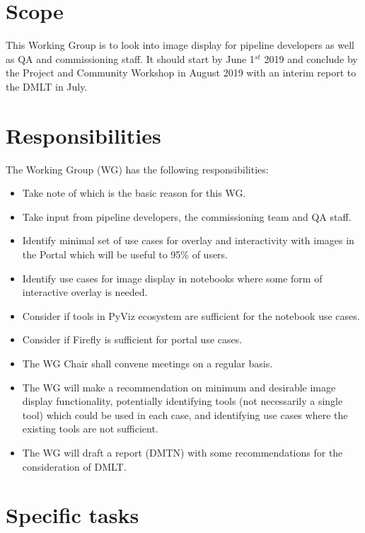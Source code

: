\section{Scope}

This Working Group is to look into image display for pipeline developers as well as \gls{QA} and commissioning staff.
It should start by June  1$^{st}$ 2019 and conclude by the Project and Community Workshop in August 2019 with an interim report to the  \gls{DMLT} in July.


\section{Responsibilities}

The Working Group (\gls{WG}) has the following responsibilities:

\begin{itemize}
 \item Take note of  which is the basic reason for this \gls{WG}.
 \item Take input from pipeline developers, the commissioning team and \gls{QA} staff.
 \item Identify minimal set of use cases for overlay and interactivity with images in the Portal which will be useful to 95\% of users.
 \item Identify use cases for image display in notebooks where some form of interactive overlay is needed.
 \item Consider if tools in PyViz ecosystem are sufficient for the notebook use cases.
 \item Consider if Firefly is sufficient for portal use cases.
 \item The \gls{WG} Chair shall convene meetings on a regular basis.
 \item The \gls{WG} will make a recommendation on minimum and desirable image display functionality, potentially identifying tools (not necessarily a single tool) which could be used in each case, and identifying use cases where the existing tools are not sufficient.
 \item The \gls{WG} will draft a report (DMTN)  with some recommendations for the consideration of \gls{DMLT}.
\end{itemize}


\section{Specific tasks}

